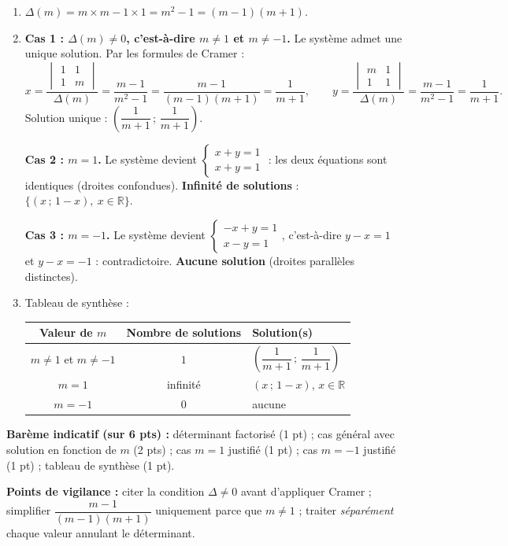 \documentclass[11pt]{article}
\begin{document}
\begin{corrige}
\begin{enumerate}
\item $\Delta(m) = m\times m - 1\times 1 = m^2 - 1 = (m-1)(m+1)$.
\item \textbf{Cas 1 : $\Delta(m) \neq 0$, c'est-à-dire $m \neq 1$ et $m \neq -1$.} Le système admet une unique solution. Par les formules de Cramer :
\[
x = \frac{\begin{vmatrix} 1 & 1 \\ 1 & m \end{vmatrix}}{\Delta(m)} = \frac{m-1}{m^2-1} = \frac{m-1}{(m-1)(m+1)} = \frac{1}{m+1},
\qquad
y = \frac{\begin{vmatrix} m & 1 \\ 1 & 1 \end{vmatrix}}{\Delta(m)} = \frac{m-1}{m^2-1} = \frac{1}{m+1}.
\]
Solution unique : $\left(\dfrac{1}{m+1}\,;\,\dfrac{1}{m+1}\right)$.

\textbf{Cas 2 : $m = 1$.} Le système devient $\begin{cases} x + y = 1 \\ x + y = 1 \end{cases}$ : les deux équations sont identiques (droites confondues). \textbf{Infinité de solutions} : $\{(x\,;\,1-x),\ x\in\mathbb{R}\}$.

\textbf{Cas 3 : $m = -1$.} Le système devient $\begin{cases} -x + y = 1 \\ x - y = 1 \end{cases}$, c'est-à-dire $y - x = 1$ et $y - x = -1$ : contradictoire. \textbf{Aucune solution} (droites parallèles distinctes).
\item Tableau de synthèse :
\begin{center}
\begin{tabularx}{\linewidth}{|c|c|X|}\hline
\rowcolor{popblueL} Valeur de $m$ & Nombre de solutions & Solution(s) \\ \hline
$m \neq 1$ et $m \neq -1$ & $1$ & $\left(\dfrac{1}{m+1}\,;\,\dfrac{1}{m+1}\right)$ \\ \hline
$m = 1$ & infinité & $(x\,;\,1-x)$, $x\in\mathbb{R}$ \\ \hline
$m = -1$ & $0$ & aucune \\ \hline
\end{tabularx}
\end{center}
\end{enumerate}
\textbf{Barème indicatif (sur 6 pts) :} déterminant factorisé (1 pt) ; cas général avec solution en fonction de $m$ (2 pts) ; cas $m=1$ justifié (1 pt) ; cas $m=-1$ justifié (1 pt) ; tableau de synthèse (1 pt).

\textbf{Points de vigilance :} citer la condition $\Delta \neq 0$ avant d'appliquer Cramer ; simplifier $\dfrac{m-1}{(m-1)(m+1)}$ uniquement parce que $m \neq 1$ ; traiter \emph{séparément} chaque valeur annulant le déterminant.
\end{corrige}
\end{document}
